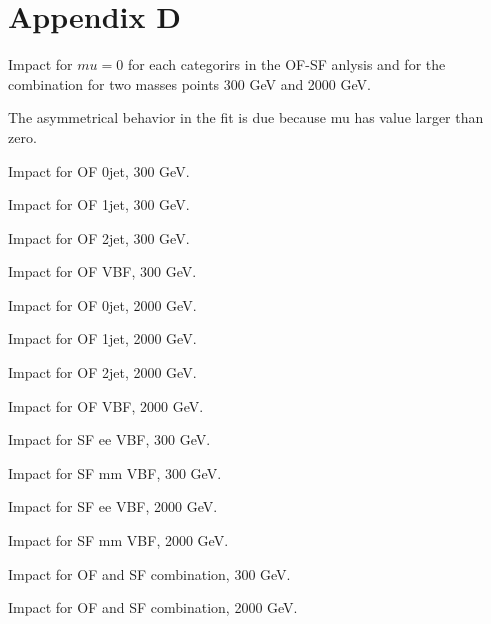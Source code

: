 \section{Appendix D}\label{sec:AppD}

Impact for $mu=0$ for each categorirs in the OF-SF anlysis and for the combination for two masses points 300 GeV and 2000 GeV.

The asymmetrical behavior in the fit is due because mu has value larger than zero.

Impact for OF 0jet, 300 GeV.


Impact for OF 1jet, 300 GeV.


Impact for OF 2jet, 300 GeV.


Impact for OF VBF, 300 GeV.





Impact for OF 0jet, 2000 GeV.


Impact for OF 1jet, 2000 GeV.


Impact for OF 2jet, 2000 GeV.


Impact for OF VBF, 2000 GeV.




Impact for SF ee VBF, 300 GeV.


Impact for SF mm VBF, 300 GeV.



Impact for SF ee VBF, 2000 GeV.


Impact for SF mm VBF, 2000 GeV.



Impact for OF and SF combination, 300 GeV.



Impact for OF and SF combination, 2000 GeV.







